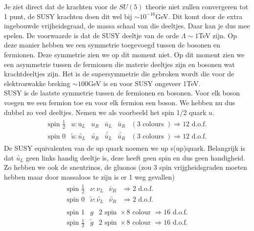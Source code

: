 \documentclass[../main.tex]{subfiles}
\begin{document}
Je ziet direct dat de krachten voor de $SU(5)$ theorie niet zullen convergeren tot 1 punt, de SUSY krachten doen dit wel bij $\sim 10^{-16}$GeV. Dit komt door de extra ingebouwde vrijheidsgraad, de massa schaal van die deeltjes. Daar kan je dus mee spelen. De voorwaarde is dat de SUSY deeltje van de orde $\Lambda \sim 1$TeV zijn. Op deze manier hebben we een symmetrie toegevoegd tussen de bosonen en fermionen. Deze symmetrie zien we op dit moment niet. Op dit moment zien we een asymmetrie tussen de fermionen die materie deeltjes zijn en bosonen wat krachtdeeltjes zijn. Het is de supersymmetrie die gebroken wordt die voor de elektrozwakke breking $\sim 100$GeV is en voor SUSY ongeveer 1TeV.\\
SUSY is de laatste symmetrie tussen de fermionen en bosonen. Voor elk boson voegen we een fermion toe en voor elk fermion een boson. We hebben nu dus dubbel zo veel deeltjes. Nemen we als voorbeeld het spin 1/2 quark $u$.
\begin{equation}
    \begin{aligned}
        \label{eq:susy_deeltjes_1}
        \begin{array}{llllll}
            \text{ spin } \frac{1}{2} & u: \text{u}_{L} & u_{R} & \bar{u}_{L} & \bar{u}_{R} & (3 \text { colours }) \Rightarrow 12 \text { d.o.f. } \\
            \text { spin } 0 & \tilde{u}: \widetilde{u_{L}} & \widetilde{u_{R}} & \widetilde{\bar{u}_{L}} & \widetilde{\bar{u}_{R}} & (3 \text { colours }) \Rightarrow 12 \text { d.o.f. }
        \end{array}
    \end{aligned}
\end{equation}
De SUSY equivalenten van de up quark noemen we up s(up)quark. Belangrijk is dat $\widetilde{u_{L}}$ geen links handig deeltje is, deze heeft geen spin en dus geen handigheid. Zo hebben we ook de sneutrinos, de gluonos (zou 3 spin vrijgheidsgraden moeten hebben maar door massaloos te zijn is er 1 weg gevallen)
\begin{equation}
    \begin{aligned}
        \label{eq:susy_deeltjes_2}
        \begin{array}{llll}
            \text{ spin } \frac{1}{2} & \nu: \nu_{L} & \bar{\nu}_{R} & \Rightarrow 2 \text { d.o.f. } \\
            \text{ spin } 0 & \tilde{\nu}: \widetilde{\nu_{L}} & \widetilde{\nu_{R}} & \Rightarrow 2 \text { d.o.f. }
        \end{array}\\
        \begin{array}{lll}
            \text { spin } 1 & g & 2 \text{ spin } \times 8 \text { colour } \Rightarrow 16 \text { d.o.f. } \\
            \text{ spin } \frac{1}{2} & \tilde{g} & 2 \text{ spin } \times 8 \text { colour } \Rightarrow 16 \text { d.o.f. }
        \end{array}
    \end{aligned}
\end{equation}
\end{document}
